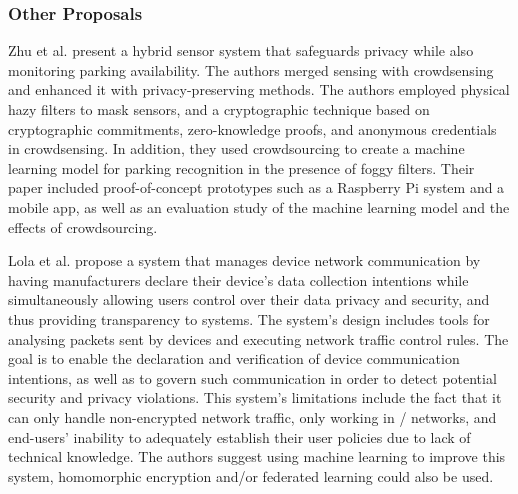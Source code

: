 \subsubsection{Other Proposals}

Zhu et al. \cite{ZhuIntegrating} present a hybrid sensor system that safeguards
privacy while also monitoring parking availability. The authors merged \hyperlink{\acronym}{\acronym}
sensing with crowdsensing and enhanced it with privacy-preserving methods.
The authors employed physical hazy filters to mask \hyperlink{\acronym}{\acronym} sensors,
and a cryptographic technique based on cryptographic commitments, zero-knowledge
proofs, and anonymous credentials in crowdsensing. In addition, they used
crowdsourcing to create a machine learning model for parking recognition
in the presence of foggy filters. Their paper included proof-of-concept
prototypes such as a Raspberry Pi system and a mobile app, as well as an
evaluation study of the machine learning model and the effects of crowdsourcing.

Lola et al. \cite{electronics12122589} propose a system that manages \hyperlink{\acronym}{\acronym}
device network communication by having manufacturers declare their device's
data collection intentions while simultaneously allowing \hyperlink{\acronym}{\acronym} users control
over their data privacy and security, and thus providing transparency to
\hyperlink{\acronym}{\acronym} systems. The system's design includes tools for analysing packets sent
by \hyperlink{\acronym}{\acronym} devices and executing network traffic control rules. The goal is
to enable the declaration and verification of \hyperlink{\acronym}{\acronym} device communication
intentions, as well as to govern such communication in order to detect
potential security and privacy violations. This system's limitations include
the fact that it can only handle non-encrypted network traffic, only working
in \hyperlink{\acronym}{\acronym}/\hyperlink{\acronym}{\acronym} networks, and end-users' inability to adequately establish
their user policies due to lack of technical knowledge. The authors
suggest using machine learning to improve this system, homomorphic encryption
and/or federated learning could also be used.

